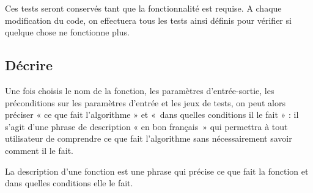 \noindent Ces tests seront conservés tant que la fonctionnalité est requise. 
A chaque modification du code, on effectuera tous les tests ainsi définis 
pour vérifier si quelque chose ne fonctionne plus.

\subsection{Décrire}
Une fois choisis le nom de la fonction, les paramètres d'entrée-sortie, les préconditions
sur les paramètres d'entrée et les jeux de tests, on peut alors préciser « ce que fait l'algorithme » 
et «~dans quelles conditions il le fait » :
il s'agit d'une phrase de description « en bon français~» qui permettra
à tout utilisateur de comprendre ce que fait l'algorithme sans 
nécessairement savoir comment il le fait.

\begin{defin}
La description d'une fonction est une phrase qui précise ce que fait la fonction 
et dans quelles conditions elle le fait.
\end{defin}

